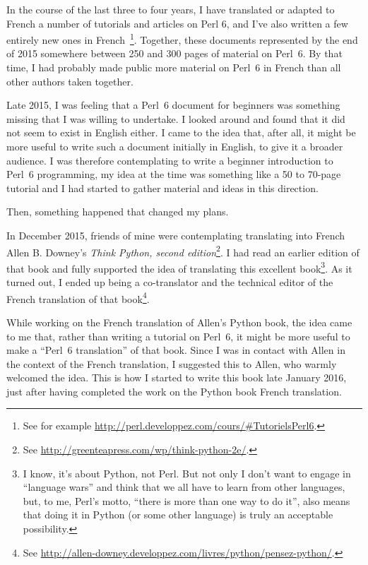 In the course of the last three to four years, I  
have translated or adapted to French a number of tutorials 
and articles on Perl 6, and I've also written a few entirely 
new ones in French~\footnote{See for example 
\url{http://perl.developpez.com/cours/\#TutorielsPerl6}.}. 
Together, these documents represented by the end of 2015 
somewhere between 250 and 300 pages of material on Perl~6. 
By that time, I had 
probably made public more material on Perl~6 in French than 
all other authors taken together.

Late 2015, I was feeling that a Perl~6 document for beginners 
was something missing that I was willing to undertake. 
I looked around and found that it did not seem to 
exist in English either. I came to the idea that, after all, 
it might be more useful to write such a document initially 
in English, to give it a broader audience. I was therefore 
contemplating to write a beginner introduction to Perl~6 
programming, my idea at the time was something like a 50 to 
70-page tutorial and I had started to gather material and ideas 
in this direction.

Then, something happened that changed my plans.

In December 2015, friends of mine were contemplating translating 
into French Allen B. Downey's \emph{Think Python, second edition}\footnote{See \url{http://greenteapress.com/wp/think-python-2e/}.}. 
I had read an earlier edition of that book and fully supported 
the idea of translating this excellent book\footnote{I know, it's 
about Python, not Perl. But not only I don't want to engage 
in ``language wars'' and think that we all have to learn from 
other languages, but, to me, Perl's motto, ``there is more than 
one way to do it'', also means that doing it in Python (or some 
other language) is truly an acceptable possibility.}. As it 
turned out, I ended up being a co-translator and the technical 
editor of the French translation of that book\footnote{See 
\url{http://allen-downey.developpez.com/livres/python/pensez-python/}.}.

While working on the French translation of Allen's Python book, 
the idea came to me that, rather than writing a tutorial on 
Perl~6, it might be more useful to make a ``Perl~6 translation'' 
of that book. Since I was in contact with Allen in the context 
of the French translation, I suggested this to Allen, who 
warmly welcomed the idea. This is how I started to write this 
book late January 2016, just after having completed the 
work on the Python book French translation.

